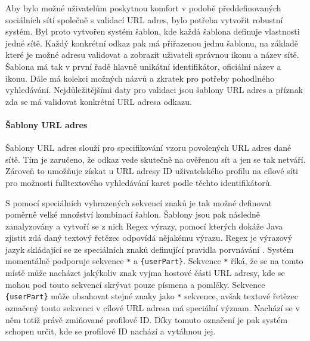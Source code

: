		Aby bylo možné uživatelům poskytnou komfort v podobě předdefinovaných sociálních sítí společně s validací \ac{URL} adres,
		bylo potřeba vytvořit robustní systém.
		Byl proto vytvořen systém šablon, kde každá šablona definuje vlastnosti jedné sítě.
		Každý konkrétní odkaz pak má přiřazenou jednu šablonu, na základě které je možné adresu validovat a
		zobrazit uživateli správnou ikonu a název sítě.
		Šablona má tak v první řadě hlavně unikátní identifikátor, oficiální název a ikonu.
		Dále má kolekci možných názvů a zkratek pro potřeby pohodlného vyhledávání.
		Nejdůležitějšími daty pro validaci jsou šablony \ac{URL} adres a příznak zda se má validovat konkrétní \ac{URL} adresa odkazu.


			\paragraph{Šablony URL adres}

			Šablony \ac{URL} adres slouží pro specifikování vzoru povolených \ac{URL} adres dané sítě.
			Tím je zaručeno, že odkaz vede skutečně na ověřenou sít a jen se tak netváří.
			Zároveň to umožňuje získat u \ac{URL} adresy ID uživatelského profilu na cílové síti pro možnosti fulltextového
			vyhledávání karet podle těchto identifikátorů.

			S pomocí speciálních vyhrazených sekvencí znaků je tak možné definovat poměrně velké množství kombinací
			šablon.
			Šablony jsou pak následně zanalyzovány a vytvoří se z nich Regex výrazy, pomocí kterých dokáže Java zjistit
			zdá daný textový řetězec odpovídá nějakému výrazu.
			Regex je výrazový jazyk skládající se ze speciálních znaků definující pravidla porvnávání \cite{regex}.
			Systém momentálně podporuje sekvence \lstinline{*} a \lstinline!{userPart}!.
			Sekvence \lstinline{*} říká, že se na tomto místě může nacházet jakýkoliv znak vyjma hostové části \ac{URL}
			adresy, kde se mohou pod touto sekvencí skrývat pouze písmena a pomlčky.
			Sekvence \lstinline!{userPart}! může obsahovat stejné znaky jako \lstinline{*} sekvence, avšak textové
			řetězec označený touto sekvenci v cílové \ac{URL} adresa má speciální význam.
			Nachází se v něm totiž právě zmiňované profilové ID.
			Díky tomuto označení je pak systém schopen určit, kde se profilové ID nachází a vytáhnou jej.

